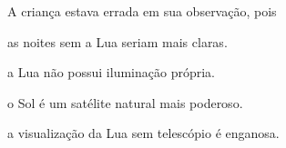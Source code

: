 A criança estava errada em sua observação, pois

\begin{escolha}
\item as noites sem a Lua seriam mais claras.

\item a Lua não possui iluminação própria.

\item o Sol é um satélite natural mais poderoso.

\item a visualização da Lua sem telescópio é enganosa.
\end{escolha}


\pagebreak